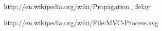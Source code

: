 \begin{thebibliography}{9}

 http://en.wikipedia.org/wiki/Propagation\_delay

 http://en.wikipedia.org/wiki/File:MVC-Process.svg

\end{thebibliography}